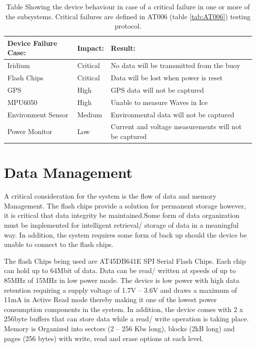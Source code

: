 \begin{table}[H]
    \centering
     \caption{Table Showing the device behaviour in case of a critical failure in one or more of the subsystems. Critical failures are defined in AT006 (table \ref{tab:AT006}) testing protocol.}
    \begin{tabular}{|l|l|l|}
    \hline
       \textbf{Device Failure Case:}  & \textbf{Impact:} & \textbf{Result:}\\
       \hline
       Iridium & Critical & No data will be transmitted from the buoy \\
       \hline
       Flash Chips & Critical & Data will be lost when power is reset \\
       \hline
       GPS & High & GPS data will not be captured \\
       \hline
       MPU6050 & High & Unable to measure Waves in Ice  \\
       \hline
       Environment Sensor & Medium & Environmental data will not be captured \\
       \hline
       Power Monitor & Low & Current and voltage measurements will not be captured \\
       \hline
    \end{tabular}
    \label{tab:exe_subsy_Failiure}
\end{table}
\section{Data Management}

A critical consideration for the system is the flow of data and memory Management. The flash chips provide a solution for permanent storage however, it is critical that data integrity be maintained.Some form of data organization must be implemented for intelligent retrieval/ storage of data in a meaningful way. In addition, the system requires some form of back up should the device be unable to connect to the flash chips. \par 

The flash Chips being used are AT45DB641E SPI Serial Flash Chips. Each chip can hold up to 64Mbit of data. Data can be read/ written at speeds of up to 85MHz of 15MHz in low power mode. The device is low power with high data retention requiring a supply voltage of 1.7V – 3.6V and draws a maximum of 11mA in Active Read mode thereby making it one of the lowest power consumption components in the system. In addition, the device comes with 2 x 256byte buffers that can store data while a read/ write operation is taking place. Memory is Organized into sectors (2 – 256 Kbs long), blocks (2kB long) and pages (256 bytes) with write, read and erase options at each level. \par 

